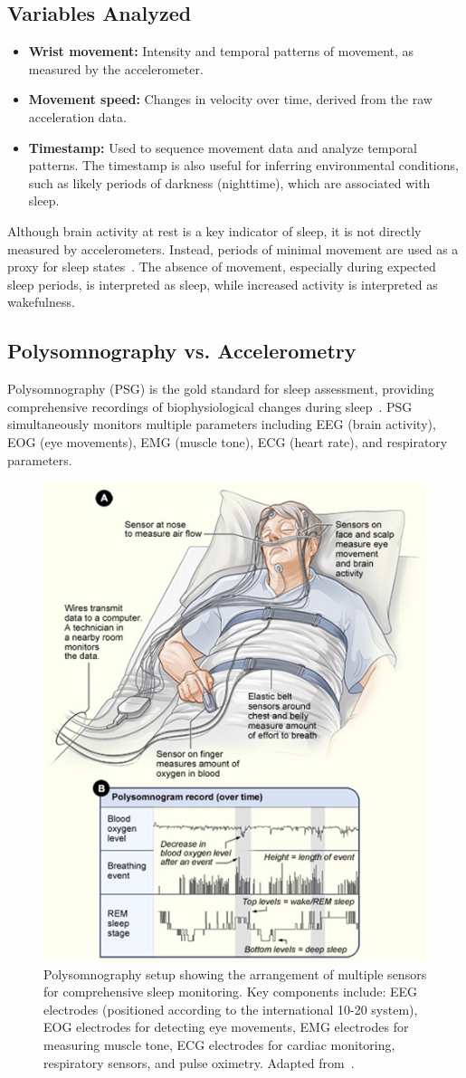 \documentclass[conference]{IEEEtran}
\begin{document}
\subsection{Variables Analyzed}
\begin{itemize}
	\item \textbf{Wrist movement:} Intensity and temporal patterns of movement, as measured by the accelerometer.
	\item \textbf{Movement speed:} Changes in velocity over time, derived from the raw acceleration data.
	\item \textbf{Timestamp:} Used to sequence movement data and analyze temporal patterns. The timestamp is also useful for inferring environmental conditions, such as likely periods of darkness (nighttime), which are associated with sleep.
\end{itemize}

Although brain activity at rest is a key indicator of sleep, it is not directly measured by accelerometers. Instead, periods of minimal movement are used as a proxy for sleep states~\cite{pmc5781106}. The absence of movement, especially during expected sleep periods, is interpreted as sleep, while increased activity is interpreted as wakefulness.

\subsection{Polysomnography vs. Accelerometry}

Polysomnography (PSG) is the gold standard for sleep assessment, providing comprehensive recordings of biophysiological changes during sleep~\cite{rechtschaffen1968, aasm2007}. PSG simultaneously monitors multiple parameters including EEG (brain activity), EOG (eye movements), EMG (muscle tone), ECG (heart rate), and respiratory parameters.

\begin{figure}[h]
	\centering
	\includegraphics[width=0.5\linewidth]{figures/psg_setup_diagram.png}
	\caption{Polysomnography setup showing the arrangement of multiple sensors for comprehensive sleep monitoring. Key components include: EEG electrodes (positioned according to the international 10-20 system), EOG electrodes for detecting eye movements, EMG electrodes for measuring muscle tone, ECG electrodes for cardiac monitoring, respiratory sensors, and pulse oximetry. Adapted from~\cite{psychdb2023}.}
	\label{fig:psg_setup}
\end{figure}
\end{document}
